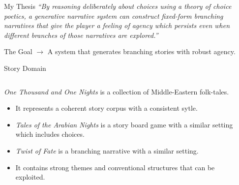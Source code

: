 \documentclass[xcolor=x11names]{beamer}
\newcommand{\work}[1]{\textit{#1}\xspace}
\begin{document}
\begin{frame}{My Thesis}
  \itshape
``By reasoning deliberately about choices using a theory of choice poetics, a generative narrative system can construct fixed-form branching narratives that give the player a feeling of agency which persists even when different branches of those narratives are explored.''
\end{frame}

\begin{frame}{The Goal}
  \color{black} $\rightarrow$ A system that generates branching stories with robust agency.
\end{frame}

\begin{frame}{Story Domain}
  \begin{columns}[T]
    \begin{column}{.6\textwidth}
      \begin{block}{}
\work{One Thousand and One Nights} is a collection of Middle-Eastern folk-tales.
\begin{itemize}
  \item It represents a coherent story corpus with a consistent sytle.
  \item \work{Tales of the Arabian Nights} is a story board game with a similar setting which includes choices.
  \item \work{Twist of Fate} is a branching narrative with a similar setting.
  \item It contains strong themes and conventional structures that can be exploited.
\end{itemize}
      \end{block}
    \end{column}
    \begin{column}{.4\textwidth}
      \begin{block}{}

\end{block}
\end{column}
\end{columns}
\end{frame}
\end{document}
